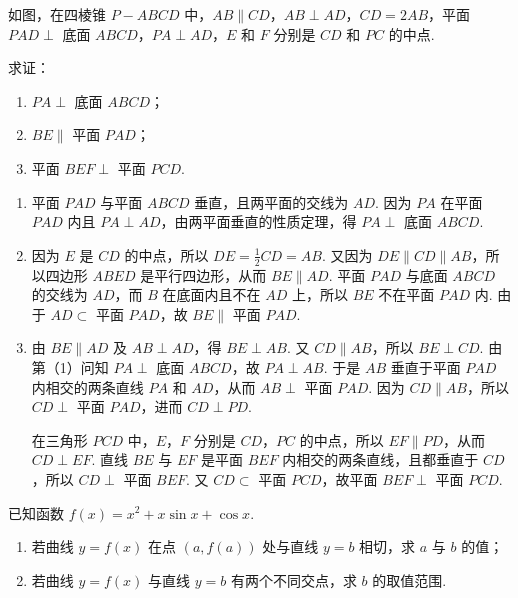 \begin{problem}
如图，在四棱锥 \(P - ABCD\) 中，\(AB \parallel CD\)，\(AB \perp AD\)，\(CD = 2AB\)，平面 \(PAD \perp\) 底面 \(ABCD\)，\(PA \perp AD\)，\(E\) 和 \(F\) 分别是 \(CD\) 和 \(PC\) 的中点.

求证：
\begin{enumerate}
\item \(PA \perp\) 底面 \(ABCD\)；
\item \(BE \parallel\) 平面 \(PAD\)；
\item 平面 \(BEF \perp\) 平面 \(PCD\).
\end{enumerate}

\end{problem}

\begin{solution}
\begin{enumerate}
\item 平面 \(PAD\) 与平面 \(ABCD\) 垂直，且两平面的交线为 \(AD\). 因为 \(PA\) 在平面 \(PAD\) 内且 \(PA\perp AD\)，由两平面垂直的性质定理，得 \(PA\perp\) 底面 \(ABCD\).
\item 因为 \(E\) 是 \(CD\) 的中点，所以 \(DE=\frac{1}{2}CD=AB\). 又因为 \(DE\parallel CD\parallel AB\)，所以四边形 \(ABED\) 是平行四边形，从而 \(BE\parallel AD\). 平面 \(PAD\) 与底面 \(ABCD\) 的交线为 \(AD\)，而 \(B\) 在底面内且不在 \(AD\) 上，所以 \(BE\) 不在平面 \(PAD\) 内. 由于 \(AD\subset\) 平面 \(PAD\)，故 \(BE\parallel\) 平面 \(PAD\).
\item 由 \(BE\parallel AD\) 及 \(AB\perp AD\)，得 \(BE\perp AB\). 又 \(CD\parallel AB\)，所以 \(BE\perp CD\). 由第（1）问知 \(PA\perp\) 底面 \(ABCD\)，故 \(PA\perp AB\). 于是 \(AB\) 垂直于平面 \(PAD\) 内相交的两条直线 \(PA\) 和 \(AD\)，从而 \(AB\perp\) 平面 \(PAD\). 因为 \(CD\parallel AB\)，所以 \(CD\perp\) 平面 \(PAD\)，进而 \(CD\perp PD\).

在三角形 \(PCD\) 中，\(E\)，\(F\) 分别是 \(CD\)，\(PC\) 的中点，所以 \(EF\parallel PD\)，从而 \(CD\perp EF\). 直线 \(BE\) 与 \(EF\) 是平面 \(BEF\) 内相交的两条直线，且都垂直于 \(CD\)，所以 \(CD\perp\) 平面 \(BEF\). 又 \(CD\subset\) 平面 \(PCD\)，故平面 \(BEF\perp\) 平面 \(PCD\).
\end{enumerate}
\end{solution}


\begin{problem}
已知函数 \( f(x) = x^2 + x \sin x + \cos x \).
\begin{enumerate}
\item 若曲线 \( y = f(x) \) 在点 \((a, f(a))\) 处与直线 \( y = b \) 相切，求 \( a \) 与 \( b \) 的值；
\item 若曲线 \( y = f(x) \) 与直线 \( y = b \) 有两个不同交点，求 \( b \) 的取值范围.
\end{enumerate}
\end{problem}

